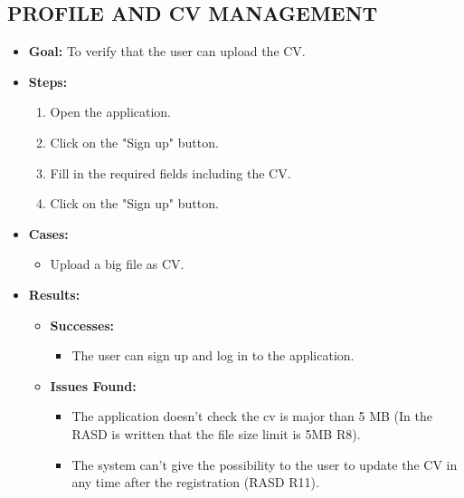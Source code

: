 \subsection{PROFILE AND CV MANAGEMENT}\label{subsec:profile-and-cv-management}
\begin{itemize}
    \item \textbf{Goal:} To verify that the user can upload the CV.

    \item \textbf{Steps:}
    \begin{enumerate}
        \item Open the application.
        \item Click on the "Sign up" button.
        \item Fill in the required fields including the CV.
        \item Click on the "Sign up" button.
    \end{enumerate}
    \item \textbf{Cases:}
    \begin{itemize}
        \item Upload a big file as CV.
    \end{itemize}
    \item \textbf{Results:}
    \begin{itemize}
        \item \textbf{Successes:}
        \begin{itemize}
            \item The user can sign up and log in to the application.
        \end{itemize}
        \item \textbf{Issues Found:}
        \begin{itemize}
            \item The application doesn't check the cv is major than 5 MB (In the RASD is written that the file size limit is 5MB R8).
            \item The system can't give the possibility to the user to update the CV in any time after the registration (RASD R11).
        \end{itemize}
    \end{itemize}
\end{itemize}


